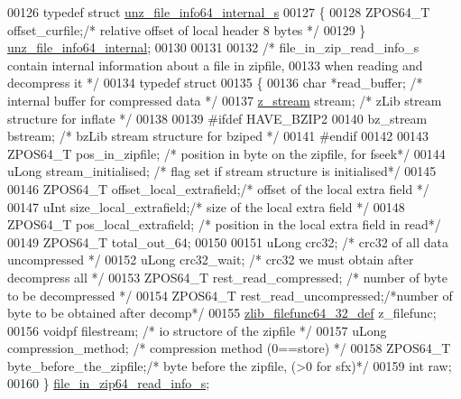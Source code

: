 \begin{DoxyCode}
00126 \textcolor{keyword}{typedef} \textcolor{keyword}{struct }\hyperlink{structunz__file__info64__internal__s}{unz\_file\_info64\_internal\_s}
00127 \{
00128     ZPOS64\_T offset\_curfile;\textcolor{comment}{/* relative offset of local header 8 bytes */}
00129 \} \hyperlink{structunz__file__info64__internal__s}{unz\_file\_info64\_internal};
00130 
00131 
00132 \textcolor{comment}{/* file\_in\_zip\_read\_info\_s contain internal information about a file in zipfile,}
00133 \textcolor{comment}{    when reading and decompress it */}
00134 \textcolor{keyword}{typedef} \textcolor{keyword}{struct}
00135 \{
00136     \textcolor{keywordtype}{char}  *read\_buffer;         \textcolor{comment}{/* internal buffer for compressed data */}
00137     \hyperlink{structz__stream__s}{z\_stream} stream;            \textcolor{comment}{/* zLib stream structure for inflate */}
00138 
00139 \textcolor{preprocessor}{#ifdef HAVE\_BZIP2}
00140     bz\_stream bstream;          \textcolor{comment}{/* bzLib stream structure for bziped */}
00141 \textcolor{preprocessor}{#endif}
00142 
00143     ZPOS64\_T pos\_in\_zipfile;       \textcolor{comment}{/* position in byte on the zipfile, for fseek*/}
00144     uLong stream\_initialised;   \textcolor{comment}{/* flag set if stream structure is initialised*/}
00145 
00146     ZPOS64\_T offset\_local\_extrafield;\textcolor{comment}{/* offset of the local extra field */}
00147     uInt  size\_local\_extrafield;\textcolor{comment}{/* size of the local extra field */}
00148     ZPOS64\_T pos\_local\_extrafield;   \textcolor{comment}{/* position in the local extra field in read*/}
00149     ZPOS64\_T total\_out\_64;
00150 
00151     uLong crc32;                \textcolor{comment}{/* crc32 of all data uncompressed */}
00152     uLong crc32\_wait;           \textcolor{comment}{/* crc32 we must obtain after decompress all */}
00153     ZPOS64\_T rest\_read\_compressed; \textcolor{comment}{/* number of byte to be decompressed */}
00154     ZPOS64\_T rest\_read\_uncompressed;\textcolor{comment}{/*number of byte to be obtained after decomp*/}
00155     \hyperlink{structzlib__filefunc64__32__def__s}{zlib\_filefunc64\_32\_def} z\_filefunc;
00156     voidpf filestream;        \textcolor{comment}{/* io structore of the zipfile */}
00157     uLong compression\_method;   \textcolor{comment}{/* compression method (0==store) */}
00158     ZPOS64\_T byte\_before\_the\_zipfile;\textcolor{comment}{/* byte before the zipfile, (>0 for sfx)*/}
00159     \textcolor{keywordtype}{int}   raw;
00160 \} \hyperlink{structfile__in__zip64__read__info__s}{file\_in\_zip64\_read\_info\_s};

\end{DoxyCode}
